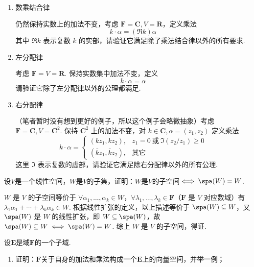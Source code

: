 \begin{exercise}
\begin{exgroup}
\begin{enumerate}
            \item 数乘结合律

            仍然保持实数上的加法不变，考虑 $\mathbf{F}=\mathbf{C}, V=\mathbf{R}$，定义乘法
            \[
                k\cdot \alpha = (\Re k) \alpha
            \]
            其中 $\Re k$ 表示复数 $k$ 的实部，请验证它满足除了乘法结合律以外的所有要求.

            \item 左分配律

            考虑 $\mathbf{F}=V=\mathbf{R}$. 保持实数集中加法不变，定义
            \[
                k\cdot \alpha = \alpha
            \]
            请验证它除了左分配律以外的公理都满足.

            \item 右分配律

            （笔者暂时没有想到更好的例子，所以这个例子会略微抽象）考虑 $\mathbf{F}=\mathbf{C}, V=\mathbf{C}^2$. 保持 $\mathbf{C}^2$ 上的加法不变，对 $k\in\mathbf{C}, \alpha = (z_1, z_2)$ 定义乘法
            \[
                k\cdot\alpha = \begin{cases}
                    (k z_1, k z_2), & z_1 = 0~\text{或}~\Im(z_2 / z_1) \geqslant 0\\
                    (\overline{k} z_1, \overline{k} z_2), & \text{其它}
                \end{cases}
            \]
            这里 $\Im$ 表示复数的虚部，请验证它满足除右分配律以外的所有公理.
        \end{enumerate}
        \begin{answer}

        \end{answer}

        \item 设$V$是一个线性空间，$W$是$V$的子集，证明：$W$是$V$的子空间$\iff \spa(W)=W$.
        \begin{answer}
            $W$ 是 $V$ 的子空间等价于 $\forall \alpha_1,\ldots,\alpha_k\in W$，$\forall \lambda_1,\ldots,\lambda_k\in \mathbf{F}$（$\mathbf{F}$ 是 $V$ 对应数域）有 $\lambda_1\alpha_1+\cdots+\lambda_k\alpha_k\in W$. 根据线性扩张的定义，以上描述等价于 $\spa(W)\subseteq W$，又 $\spa(W)$ 是 $W$ 的线性扩张，即 $W\subseteq\spa(W)$，故$\spa(W)\subseteq W \iff \spa(W)=W$. 综上 $W$ 是 $V$ 的子空间，得证.
        \end{answer}
    \end{exgroup}

    \begin{exgroup}
        \item 设$\mathbf{E}$是域$\mathbf{F}$的一个子域.
        \begin{enumerate}
            \item 证明：$\mathbf{F}$关于自身的加法和乘法构成一个$\mathbf{E}$上的向量空间，并举一例；


\end{enumerate}
\end{exgroup}
\end{exercise}
